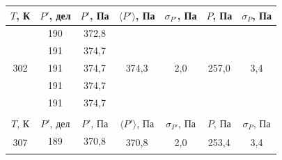 \documentclass[a4paper,12pt]{article} %
\begin{document}
\begin{table}[H]
	\centering
	\begin{tabular}{ccccccc}
		\hline
		\multicolumn{1}{|c|}{$ T $, К} &
		\multicolumn{1}{c|}{$ P' $, дел} &
		\multicolumn{1}{c|}{$ P' $, Па} &
		\multicolumn{1}{c|}{$ \langle P' \rangle $, Па} &
		\multicolumn{1}{c|}{$ \sigma_{P'} $, Па} &
		\multicolumn{1}{c|}{$ P $, Па} &
		\multicolumn{1}{c|}{$ \sigma_P $, Па} \\ \hline
		\multicolumn{1}{|c|}{\multirow{5}{*}{302}} &
		\multicolumn{1}{c|}{190} &
		\multicolumn{1}{c|}{372,8} &
		\multicolumn{1}{c|}{\multirow{5}{*}{374,3}} &
		\multicolumn{1}{c|}{\multirow{5}{*}{2,0}} &
		\multicolumn{1}{c|}{\multirow{5}{*}{257,0}} &
		\multicolumn{1}{c|}{\multirow{5}{*}{3,4}} \\ \cline{2-3}
		\multicolumn{1}{|c|}{} &
		\multicolumn{1}{c|}{191} &
		\multicolumn{1}{c|}{374,7} &
		\multicolumn{1}{c|}{} &
		\multicolumn{1}{c|}{} &
		\multicolumn{1}{c|}{} &
		\multicolumn{1}{c|}{} \\ \cline{2-3}
		\multicolumn{1}{|c|}{} &
		\multicolumn{1}{c|}{191} &
		\multicolumn{1}{c|}{374,7} &
		\multicolumn{1}{c|}{} &
		\multicolumn{1}{c|}{} &
		\multicolumn{1}{c|}{} &
		\multicolumn{1}{c|}{} \\ \cline{2-3}
		\multicolumn{1}{|c|}{} &
		\multicolumn{1}{c|}{191} &
		\multicolumn{1}{c|}{374,7} &
		\multicolumn{1}{c|}{} &
		\multicolumn{1}{c|}{} &
		\multicolumn{1}{c|}{} &
		\multicolumn{1}{c|}{} \\ \cline{2-3}
		\multicolumn{1}{|c|}{} &
		\multicolumn{1}{c|}{191} &
		\multicolumn{1}{c|}{374,7} &
		\multicolumn{1}{c|}{} &
		\multicolumn{1}{c|}{} &
		\multicolumn{1}{c|}{} &
		\multicolumn{1}{c|}{} \\ \hline
		&
		&
		&
		&
		&
		&
		\\ \hline
		\multicolumn{1}{|c|}{$ T $, К} &
		\multicolumn{1}{c|}{$ P' $, дел} &
		\multicolumn{1}{c|}{$ P' $, Па} &
		\multicolumn{1}{c|}{$ \langle P' \rangle $, Па} &
		\multicolumn{1}{c|}{$ \sigma_{P'} $, Па} &
		\multicolumn{1}{c|}{$ P $, Па} &
		\multicolumn{1}{c|}{$ \sigma_P $, Па} \\ \hline
		\multicolumn{1}{|c|}{\multirow{5}{*}{307}} &
		\multicolumn{1}{c|}{189} &
		\multicolumn{1}{c|}{370,8} &
		\multicolumn{1}{c|}{\multirow{5}{*}{370,8}} &
		\multicolumn{1}{c|}{\multirow{5}{*}{2,0}} &
		\multicolumn{1}{c|}{\multirow{5}{*}{253,4}} &
		\multicolumn{1}{c|}{\multirow{5}{*}{3,4}} \\ \cline{2-3}

\end{tabular}
\end{table}
\end{document}
